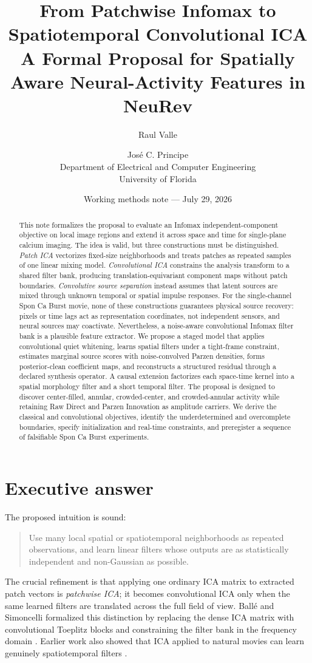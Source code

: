 \documentclass[11pt]{article}
\title{\textbf{From Patchwise Infomax to Spatiotemporal Convolutional ICA}\\
A Formal Proposal for Spatially Aware Neural-Activity Features in NeuRev}
\author{
Raul Valle \and Jos\'e C. Principe\\
Department of Electrical and Computer Engineering\\
University of Florida
}
\date{Working methods note --- July 29, 2026}
\begin{document}
\maketitle

\begin{abstract}
This note formalizes the proposal to evaluate an Infomax independent-component
objective on local image regions and extend it across space and time for
single-plane calcium imaging. The idea is valid, but three constructions must be
distinguished. \emph{Patch ICA} vectorizes fixed-size neighborhoods and treats
patches as repeated samples of one linear mixing model. \emph{Convolutional ICA}
constrains the analysis transform to a shared filter bank, producing
translation-equivariant component maps without patch boundaries.
\emph{Convolutive source separation} instead assumes that latent sources are
mixed through unknown temporal or spatial impulse responses. For the
single-channel Spon Ca Burst movie, none of these constructions guarantees
physical source recovery: pixels or time lags act as representation coordinates,
not independent sensors, and neural sources may coactivate. Nevertheless, a
noise-aware convolutional Infomax filter bank is a plausible feature extractor.
We propose a staged model that applies convolutional quiet whitening, learns
spatial filters under a tight-frame constraint, estimates marginal source scores
with noise-convolved Parzen densities, forms posterior-clean coefficient maps,
and reconstructs a structured residual through a declared synthesis operator.
A causal extension factorizes each space-time kernel into a spatial morphology
filter and a short temporal filter. The proposal is designed to discover
center-filled, annular, crowded-center, and crowded-annular activity while
retaining Raw Direct and Parzen Innovation as amplitude carriers. We derive the
classical and convolutional objectives, identify the underdetermined and
overcomplete boundaries, specify initialization and real-time constraints, and
preregister a sequence of falsifiable Spon Ca Burst experiments.
\end{abstract}

\section{Executive answer}

The proposed intuition is sound:
\begin{quote}
Use many local spatial or spatiotemporal neighborhoods as repeated observations,
and learn linear filters whose outputs are as statistically independent and
non-Gaussian as possible.
\end{quote}
The crucial refinement is that applying one ordinary ICA matrix to extracted
patch vectors is \emph{patchwise ICA}; it becomes convolutional ICA only when
the same learned filters are translated across the full field of view. Ball\'e
and Simoncelli formalized this distinction by replacing the dense ICA matrix
with convolutional Toeplitz blocks and constraining the filter bank in the
frequency domain \cite{balle2014cica}. Earlier work also showed that ICA applied
to natural movies can learn genuinely spatiotemporal filters
\cite{vanhateren1998stica}.
\end{document}
